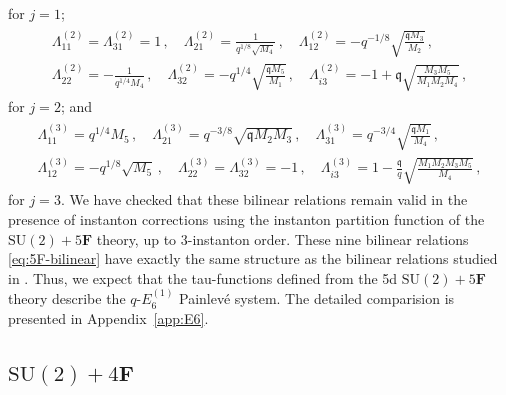 \documentclass[11pt, a4paper]{article}
\theoremstyle{definition}
\begin{document}
for $ j=1 $;
\begin{gather}
    \begin{gathered}
        \Lambda_{11}^{(2)} = \Lambda_{31}^{(2)} = 1 \, , \quad
        \Lambda_{21}^{(2)} = \frac{1}{q^{1/8} \sqrt{M_4}} \, , \quad
        \Lambda_{12}^{(2)} = -q^{-1/8} \sqrt{\frac{\mathfrak{q}M_3}{M_2}} \, , \\
        \Lambda_{22}^{(2)} = -\frac{1}{q^{1/4} M_4} \, , \quad
        \Lambda_{32}^{(2)} = -q^{1/4} \sqrt{\frac{\mathfrak{q}M_5}{M_1}} \, , \quad
        \Lambda_{i3}^{(2)} = -1 + \mathfrak{q} \sqrt{\frac{M_3M_5}{M_1M_2M_4}} \, ,
    \end{gathered}
\end{gather}
for $ j=2 $; and
\begin{gather}
    \begin{gathered}
        \Lambda_{11}^{(3)} = q^{1/4} M_5 \, , \quad
        \Lambda_{21}^{(3)} = q^{-3/8} \sqrt{\mathfrak{q}M_2M_3} \, , \quad
        \Lambda_{31}^{(3)} = q^{-3/4} \sqrt{\frac{\mathfrak{q}M_1}{M_4}} \, , \\
        \Lambda_{12}^{(3)} = -q^{1/8} \sqrt{M_5} \, , \quad
        \Lambda_{22}^{(3)} = \Lambda_{32}^{(3)} = -1 \, , \quad
        \Lambda_{i3}^{(3)} = 1 - \frac{\mathfrak{q}}{q} \sqrt{\frac{M_1M_2M_3M_5}{M_4}} \, ,
    \end{gathered}
\end{gather}
for $ j=3 $. We have checked that these bilinear relations remain valid in the presence of instanton corrections using the instanton partition function of the $ \mathrm{SU}(2)+5\mathbf{F} $ theory, up to 3-instanton order. These nine bilinear relations \eqref{eq:5F-bilinear} have exactly the same structure as the bilinear relations studied in \cite{Tsuda:2008}. Thus, we expect that the tau-functions defined from the 5d $ \mathrm{SU}(2)+5\mathbf{F} $ theory describe the $ q\text{-}E_6^{(1)} $ Painlev\'e system. The detailed comparision is presented in Appendix~\ref{app:E6}.




\subsection{\texorpdfstring{$ \mathrm{SU}(2) + 4\mathbf{F} $}{SU(2) + 4F}}\label{sec:4F}
\end{document}
